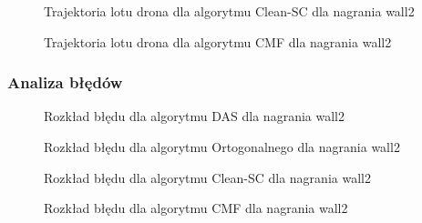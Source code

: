 \documentclass[12pt]{article}
\begin{document}
\vspace{-20pt}

\begin{figure}[h]
    \begin{minipage}[t]{0.48\textwidth}
        \centering
        
        \vspace{-40pt}
        \caption{Trajektoria lotu drona dla algorytmu Clean-SC dla nagrania wall2}
    \end{minipage}
    \hfill
    \begin{minipage}[t]{0.48\textwidth}
        \centering
        
        \vspace{-40pt}
        \caption{Trajektoria lotu drona dla algorytmu CMF dla nagrania wall2}
    \end{minipage}
\end{figure}

\newpage
\subsubsection{Analiza błędów}
\vspace{-20pt}
\begin{figure}[h]
    \centering
    \begin{minipage}[t]{0.48\textwidth}
        \centering
        
        \vspace{-30pt}
        \caption{Rozkład błędu dla algorytmu DAS dla nagrania wall2}
    \end{minipage}
    \hfill
    \begin{minipage}[t]{0.48\textwidth}
        \centering
        
        \vspace{-30pt}
        \caption{Rozkład błędu dla algorytmu Ortogonalnego dla nagrania wall2}
    \end{minipage}
\end{figure}
\vspace{-20pt}
\begin{figure}[h]
    \begin{minipage}[t]{0.48\textwidth}
        \centering
        
        \vspace{-30pt}
        \caption{Rozkład błędu dla algorytmu Clean-SC dla nagrania wall2}
    \end{minipage}
    \hfill
    \begin{minipage}[t]{0.48\textwidth}
        \centering
        
        \vspace{-30pt}
        \caption{Rozkład błędu dla algorytmu CMF dla nagrania wall2}
    \end{minipage}
\end{figure}
\end{document}
